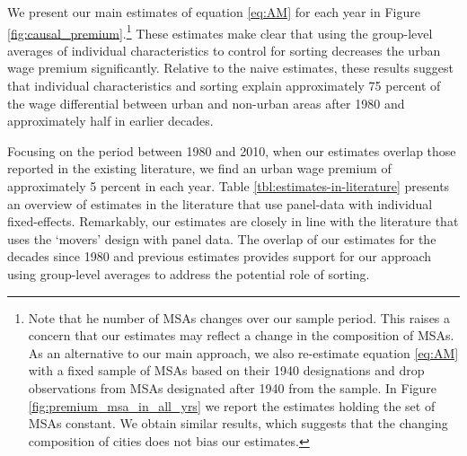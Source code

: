 \documentclass[12pt]{article}
\begin{document}
We present our main estimates of equation \eqref{eq:AM} for each year in Figure \ref{fig:causal_premium}.\footnote{
Note that he number of MSAs changes over our sample period.
This raises a concern that our estimates may reflect a change in the composition of MSAs.
As an alternative to our main approach, we also re-estimate equation \eqref{eq:AM} with a fixed sample of MSAs based on their 1940 designations and drop observations from MSAs designated after 1940 from the sample.
In Figure \ref{fig:premium_msa_in_all_yrs} we report the estimates holding the set of MSAs constant.
We obtain similar results, which suggests that the changing composition of cities does not bias our estimates.    
}
These estimates make clear that using the group-level averages of individual characteristics to control for sorting decreases the urban wage premium significantly.
Relative to the naive estimates, these results suggest that individual characteristics and sorting explain approximately 75 percent of the wage differential between urban and non-urban areas after 1980 and approximately half in earlier decades.

Focusing on the period between 1980 and 2010, when our estimates overlap those reported in the existing literature, we find an urban wage premium of approximately 5 percent in each year.
Table \ref{tbl:estimates-in-literature} presents an overview of estimates in the literature that use panel-data with individual fixed-effects.
Remarkably, our estimates are closely in line with the literature that uses the `movers' design with panel data.
The overlap of our estimates for the decades since 1980 and previous estimates provides support for our approach using group-level averages to address the potential role of sorting.
\end{document}
